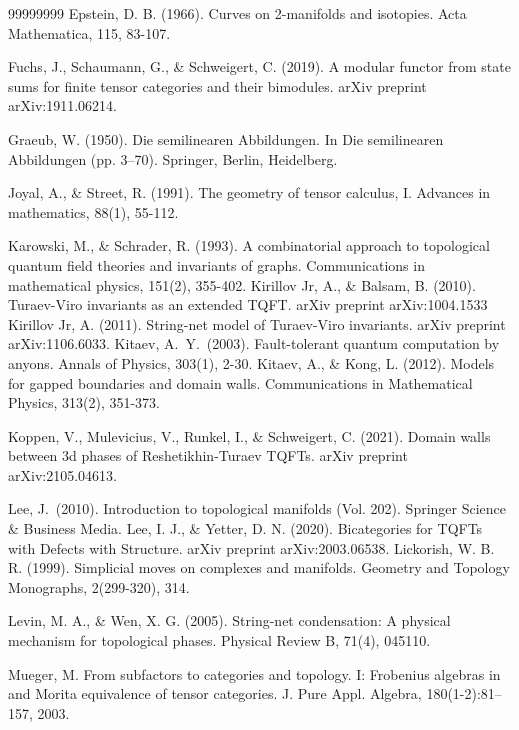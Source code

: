 \documentclass[1.5pt, a4paper]{article}
\begin{document}
\begin{thebibliography}{99999999}
 Epstein, D. B. (1966). Curves on 2-manifolds and isotopies. Acta Mathematica, 115, 83-107.

 Fuchs, J., Schaumann, G., \& Schweigert, C. (2019). A modular functor from state sums for finite tensor categories and their bimodules. arXiv preprint arXiv:1911.06214.


 Graeub, W. (1950). Die semilinearen Abbildungen. In Die semilinearen Abbildungen (pp. 3--70). Springer, Berlin, Heidelberg.

 Joyal, A., \& Street, R. (1991). The geometry of tensor calculus, I. Advances in mathematics, 88(1), 55-112.

 Karowski, M., \& Schrader, R. (1993). A combinatorial approach to topological quantum field theories and invariants of graphs. Communications in mathematical physics, 151(2), 355-402.
 Kirillov Jr, A., \& Balsam, B. (2010). Turaev-Viro invariants as an extended TQFT. arXiv preprint arXiv:1004.1533
 Kirillov Jr, A. (2011). String-net model of Turaev-Viro invariants. arXiv preprint arXiv:1106.6033.
 Kitaev, A.~Y.~(2003). Fault-tolerant quantum computation by anyons. Annals of Physics, 303(1), 2-30.
 Kitaev, A., \& Kong, L. (2012). Models for gapped boundaries and domain walls. Communications in Mathematical Physics, 313(2), 351-373.

 Koppen, V., Mulevicius, V., Runkel, I., \& Schweigert, C. (2021). Domain walls between 3d phases of Reshetikhin-Turaev TQFTs. arXiv preprint arXiv:2105.04613.

 Lee, J.~(2010). Introduction to topological manifolds (Vol. 202). Springer Science \& Business Media.
 Lee, I. J., \& Yetter, D. N. (2020). Bicategories for TQFTs with Defects with Structure. arXiv preprint arXiv:2003.06538.
 Lickorish, W. B. R. (1999). Simplicial moves on complexes and manifolds. Geometry and Topology Monographs, 2(299-320), 314.

 Levin, M. A., \& Wen, X. G. (2005). String-net condensation: A physical mechanism for topological phases. Physical Review B, 71(4), 045110.

 Mueger, M. From subfactors to categories and topology. I: Frobenius algebras in
and Morita equivalence of tensor categories. J. Pure Appl. Algebra, 180(1-2):81--157,
2003.


\end{thebibliography}
\end{document}
